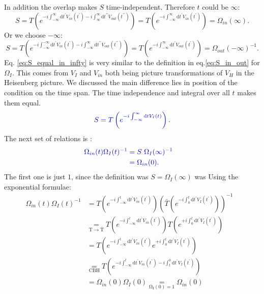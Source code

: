 \documentclass[12pt, titlepage]{article}
\begin{document}
In addition the overlap makes $ S $ time-independent. Therefore $ t $ could be $ \infty $:
\begin{equation}\label{eq:S_equal_in_infty}
S=T\left( e^{-i\int_{-\infty}^{\infty}\mathrm{d}t^{\prime} V_{in}(t^{\prime})
	 -i\int_{\infty}^{\infty}\mathrm{d}t^{\prime \prime} V_{out}(t^{\prime \prime})} \right)
=T\left( e^{-i\int_{-\infty}^{\infty}\mathrm{d}t^{\prime} V_{in}(t^{\prime})}\right)
=\Omega_{in}(\infty).
\end{equation}
Or we choose $ -\infty $:
\begin{equation}
S=T\left( e^{-i\int_{-\infty}^{-\infty}\mathrm{d}t^{\prime} V_{in}(t^{\prime})
	 -i\int_{-\infty}^{\infty}\mathrm{d}t^{\prime \prime} V_{out}(t^{\prime \prime})} \right)
=T\left( e^{-i\int_{-\infty}^{\infty}\mathrm{d}t^{\prime} V_{out}(t^{\prime})}\right)
=\Omega_{out}(-\infty)^{-1}.
\end{equation}
Eq. \eqref{eq:S_equal_in_infty} is very similar to the definition in eq.\eqref{eq:S_in_out} for $ \Omega_{I} $. This comes from $ V_{I} $ and $ V_{in} $ both being picture transformations of $ V_{H} $ in the Heisenberg picture. We discussed the main difference lies in position of the condition on the time span. The time independence and integral over all $ t $ makes them equal. 
\begin{equation}\label{eq:S_equal_in_plus_minus_infty}
\textcolor[RGB]{0,0,204}{
S=T\left( e^{-i\int_{-\infty}^{\infty}\mathrm{d}t V_{I}(t)}\right)
.}
\end{equation}
The next set of relations is :
\begin{subequations}
\textcolor[RGB]{0,0,204}{
\begin{align}
	\Omega_{in}(t)\Omega_{I}(t)^{-1}
	&=S\ \Omega_{I}(\infty)^{-1}
	&\\
	&=
	\Omega_{in}(0)	.
\end{align}
}
\end{subequations}
The first one is just $ 1 $, since the  definition was $ S = \Omega_{I}(\infty) $ was 
Using the exponential formulae:
\begin{subequations}
\begin{align}
	\Omega_{in}(t)\Omega_{I}(t)^{-1}&=
T\left( e^{-i\int_{-\infty}^{t}\mathrm{d}t^{\prime} V_{in}(t^{\prime})} \right)
 \left( \bar{T}\left( e^{-i\int_{0}^{t}\mathrm{d}t^{\prime} V_{I}(t^{\prime})} \right)
	\right)^{-1}
	&\\
	 &\underset{\mathrm{T\rightarrow\bar{T} }}{=} 
	 T\left( e^{-i\int_{-\infty}^{t}\mathrm{d}t^{\prime} V_{in}(t^{\prime})} \right)
  T\left( e^{+i\int_{0}^{t}\mathrm{d}t^{\prime} V_{I}(t^{\prime})} \right)
  &\\
  &=
  T\left( e^{-i\int_{-\infty}^{t}\mathrm{d}t^{\prime} V_{in}(t^{\prime})}
  e^{+i\int_{0}^{t}\mathrm{d}t^{\prime} V_{I}(t^{\prime})} \right)
  	&\\
	 &\underset{\mathrm{CBH}}{=} 
T\left( e^{-i\int_{-\infty}^{t}\mathrm{d}t^{\prime} V_{in}(t^{\prime})
 -i\int_{t}^{0}\mathrm{d}t^{\prime} V_{I}(t^{\prime}) }\right) 
  &\\
  &= 	\Omega_{in}(0) 	\Omega_{I}(0)\underset{\mathrm{\Omega_{I}(0)=1}}{=} 	\Omega_{in}(0)
\end{align}
\end{subequations}
\end{document}
